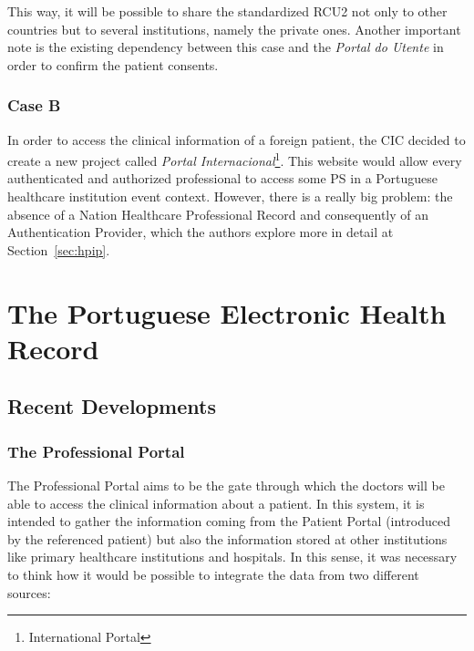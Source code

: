 This way, it will be possible to share the standardized RCU2 not only to other countries but to several institutions, namely the private ones. Another important note is the existing dependency between this case and the \textit{Portal do Utente} in order to confirm the patient consents.

\subsubsection{Case B}

In order to access the clinical information of a foreign patient, the CIC decided to create a new project called \textit{Portal Internacional}\footnote{International Portal}. This website would allow every authenticated and authorized professional to access some PS in a Portuguese healthcare institution event context. However, there is a really big problem: the absence of a Nation Healthcare Professional Record and consequently of an Authentication Provider, which the authors explore more in detail at Section~\ref{sec:hpip}.






\section{The Portuguese Electronic Health Record}

\subsection{Recent Developments}

\subsubsection{The Professional Portal}
The Professional Portal aims to be the gate through which the doctors will be able to access the clinical information about a patient. In this system, it is intended to gather the information coming from the Patient Portal (introduced by the referenced patient) but also the information stored at other institutions like primary healthcare institutions and hospitals. In this sense, it was necessary to think how it would be possible to integrate the data from two different sources:


